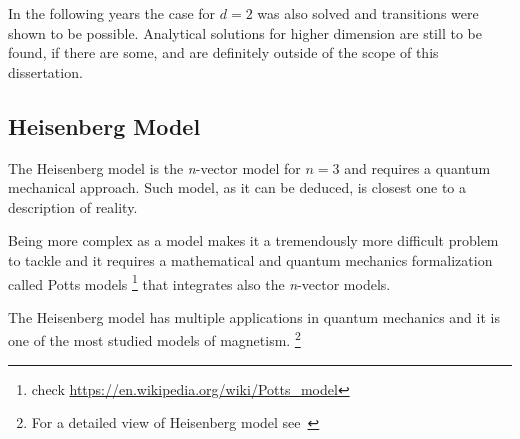 In the following years the case for $d=2$ was also solved and transitions were
shown to be possible. Analytical solutions for higher dimension are still to be
found, if there are some, and are definitely outside of the scope of this
dissertation. 


\subsection{Heisenberg Model}

The Heisenberg model is the \textit{n}-vector model for $n=3$ and requires a quantum
mechanical approach. Such model, as it can be deduced, is closest one to a description of reality.
 
Being more complex as a model makes it a tremendously more difficult problem to 
tackle and it requires a mathematical and quantum mechanics formalization called 
Potts models \footnote{check \url{https://en.wikipedia.org/wiki/Potts_model}} that
integrates also the \textit{n}-vector models.

The Heisenberg model has multiple applications in quantum mechanics and it is one
of the most studied models of magnetism. \footnote{For a detailed view of Heisenberg
model see~\textcite{Nolting2009}} 
